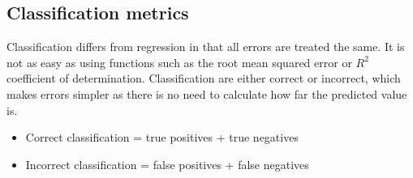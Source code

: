 \documentclass[CS5104-Notes.tex]{subfiles}
\begin{document}
\subsection{Classification metrics}
Classification differs from regression in that all errors are treated the same. It is not as easy as using functions such as the root mean squared error or $R^{2}$ coefficient of determination. Classification are either correct or incorrect, which makes errors simpler as there is no need to calculate how far the predicted value is.
\begin{itemize}
\item Correct classification = true positives + true negatives
\item Incorrect classification = false positives + false negatives
\end{itemize}
\end{document}
